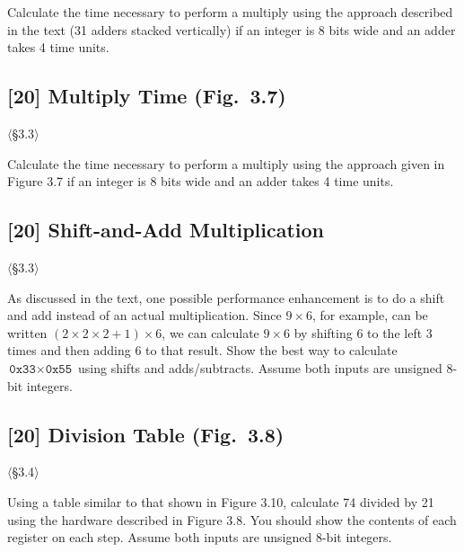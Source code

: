 \noindent Calculate the time necessary to perform a multiply using the
approach described in the text (31 adders stacked vertically) if an integer is
8 bits wide and an adder takes 4 time units.

\problembreak

\subsection{[20] Multiply Time (Fig.~3.7)}
\hypertarget{prob-3.16}{}
\noindent$\langle$\S3.3$\rangle$\medskip

\noindent Calculate the time necessary to perform a multiply using the
approach given in Figure 3.7 if an integer is 8 bits wide and an adder takes
4 time units.

\problembreak

\subsection{[20] Shift-and-Add Multiplication}
\hypertarget{prob-3.17}{}
\noindent$\langle$\S3.3$\rangle$\medskip

\noindent As discussed in the text, one possible performance enhancement is to
do a shift and add instead of an actual multiplication. Since $9 \times 6$,
for example, can be written $(2 \times 2 \times 2 + 1) \times 6$, we can
calculate $9 \times 6$ by shifting 6 to the left 3 times and then adding 6
to that result. Show the best way to calculate
$\texttt{0x33} \times \texttt{0x55}$ using shifts and adds/subtracts. Assume
both inputs are unsigned 8-bit integers.

\problembreak

\subsection{[20] Division Table (Fig.~3.8)}
\hypertarget{prob-3.18}{}
\noindent$\langle$\S3.4$\rangle$\medskip

\noindent Using a table similar to that shown in Figure 3.10, calculate 74
divided by 21 using the hardware described in Figure 3.8. You should show the
contents of each register on each step. Assume both inputs are unsigned 8-bit
integers.

\problembreak

